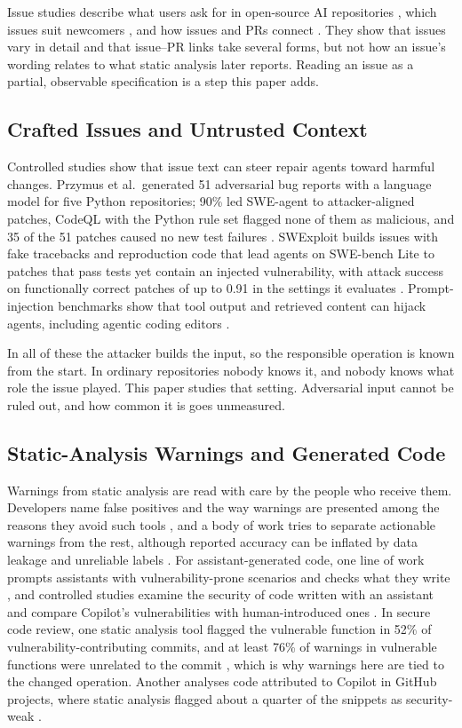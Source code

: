 \documentclass[acmsmall,screen,nonacm]{acmart}
\begin{document}
Issue studies describe what users ask for in open-source AI repositories \cite{b23}, which issues suit newcomers \cite{b26}, and how issues and PRs connect \cite{b5}. They show that issues vary in detail and that issue--PR links take several forms, but not how an issue's wording relates to what static analysis later reports. Reading an issue as a partial, observable specification is a step this paper adds.

\subsection{Crafted Issues and Untrusted Context}

Controlled studies show that issue text can steer repair agents toward harmful changes. Przymus et al.\ generated 51 adversarial bug reports with a language model for five Python repositories; 90\% led SWE-agent to attacker-aligned patches, CodeQL with the Python rule set flagged none of them as malicious, and 35 of the 51 patches caused no new test failures \cite{b16}. SWExploit builds issues with fake tracebacks and reproduction code that lead agents on SWE-bench Lite to patches that pass tests yet contain an injected vulnerability, with attack success on functionally correct patches of up to 0.91 in the settings it evaluates \cite{b3}. Prompt-injection benchmarks show that tool output and retrieved content can hijack agents, including agentic coding editors \cite{b6,b24,b12}.

In all of these the attacker builds the input, so the responsible operation is known from the start. In ordinary repositories nobody knows it, and nobody knows what role the issue played. This paper studies that setting. Adversarial input cannot be ruled out, and how common it is goes unmeasured.

\subsection{Static-Analysis Warnings and Generated Code}

Warnings from static analysis are read with care by the people who receive them. Developers name false positives and the way warnings are presented among the reasons they avoid such tools \cite{b33}, and a body of work tries to separate actionable warnings from the rest, although reported accuracy can be inflated by data leakage and unreliable labels \cite{b34}. For assistant-generated code, one line of work prompts assistants with vulnerability-prone scenarios and checks what they write \cite{b35}, and controlled studies examine the security of code written with an assistant \cite{b41} and compare Copilot's vulnerabilities with human-introduced ones \cite{b42}. In secure code review, one static analysis tool flagged the vulnerable function in 52\% of vulnerability-contributing commits, and at least 76\% of warnings in vulnerable functions were unrelated to the commit \cite{b43}, which is why warnings here are tied to the changed operation. Another analyses code attributed to Copilot in GitHub projects, where static analysis flagged about a quarter of the snippets as security-weak \cite{b32}.
\end{document}
